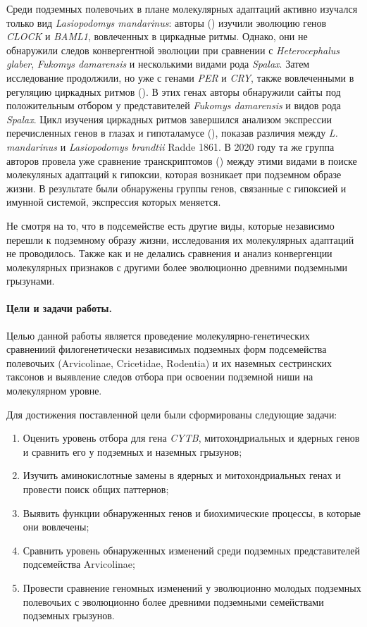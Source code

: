Среди подземных полевочьих в плане молекулярных адаптаций активно изучался только вид \textit{Lasiopodomys mandarinus}: авторы (\cite{Sun2018a}) изучили эволюцию генов \textit{CLOCK} и \textit{BAML1}, вовлеченных в циркадные ритмы. Однако, они не обнаружили следов конвергентной эволюции при сравнении с \textit{Heterocephalus glaber}, \textit{Fukomys damarensis} и несколькими видами рода \textit{Spalax}. Затем исследование продолжили, но уже с генами \textit{PER} и \textit{CRY}, также вовлеченными в регуляцию циркадных ритмов (\cite{Sun2018}). В этих генах авторы обнаружили сайты под положительным отбором у представителей \textit{Fukomys damarensis} и видов рода \textit{Spalax}. Цикл изучения циркадных ритмов завершился анализом экспрессии перечисленных генов в глазах и гипоталамусе (\cite{Sun2020}), показав различия между \textit{L. mandarinus} и \textit{Lasiopodomys brandtii} Radde 1861. В 2020 году та же группа авторов провела уже сравнение транскриптомов (\cite{Dong2020}) между этими видами в поиске молекуляных адаптаций к гипоксии, которая возникает при подземном образе жизни. В результате были обнаружены группы генов, связанные с гипоксией и имунной системой, экспрессия которых меняется. 

Не смотря на то, что в подсемействе есть другие виды, которые независимо перешли к подземному образу жизни, исследования их молекулярных адаптаций не проводилось. Также как и не делались сравнения и анализ конвергенции молекулярных признаков с другими более эволюционно древними подземными грызунами.

\paragraph{Цели и задачи работы.} Целью данной работы является проведение молекулярно-генетических сравнениий филогенетически независимых подземных форм подсемейства полевочьих (Arvicolinae, Cricetidae, Rodentia) и их наземных сестринских таксонов и выявление следов отбора при освоении подземной ниши на молекулярном уровне.

Для достижения поставленной цели были сформированы следующие задачи:
\begin{enumerate}
	\item Оценить уровень отбора для гена \textit{CYTB}, митохондриальных и ядерных генов и сравнить его у подземных и наземных грызунов;
	\item Изучить аминокислотные замены в ядерных и митохондриальных генах и провести поиск общих паттернов;
	\item Выявить функции обнаруженных генов и биохимические процессы, в которые они вовлечены;
	\item Сравнить уровень обнаруженных изменений среди подземных представителей подсемейства Arvicolinae;
	\item Провести сравнение геномных изменений у эволюционно молодых подземных полевочьих с эволюционно более древними подземными семействами подземных грызунов. 
\end{enumerate}

